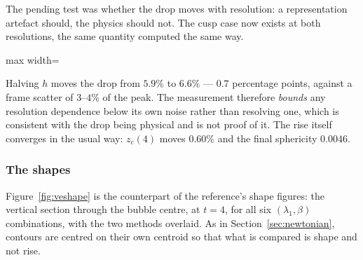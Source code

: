 The pending test was whether the drop moves with resolution: a representation
artefact should, the physics should not. The cusp case now exists at both
resolutions, the same quantity computed the same way.

\begin{table}[htbp]
\centering
\caption{The drop at two resolutions, VOF, $\lambda_1=0.4$, $\beta=0.2$.}
\label{tab:dropres}
\small
\begin{adjustbox}{max width=\linewidth}
\end{adjustbox}
\end{table}

Halving $h$ moves the drop from $5.9\%$ to $6.6\%$ --- $0.7$ percentage points,
against a frame scatter of $3$--$4\%$ of the peak. The measurement therefore
\emph{bounds} any resolution dependence below its own noise rather than
resolving one, which is consistent with the drop being physical and is not proof
of it. The rise itself converges in the usual way: $z_c(4)$ moves $0.60\%$ and
the final sphericity $0.0046$.

\subsubsection{The shapes}

Figure~\ref{fig:veshape} is the counterpart of the reference's shape figures:
the vertical section through the bubble centre, at $t=4$, for all six
$(\lambda_1,\beta)$ combinations, with the two methods overlaid. As in
Section~\ref{sec:newtonian}, contours are centred on their own centroid so that
what is compared is shape and not rise.

